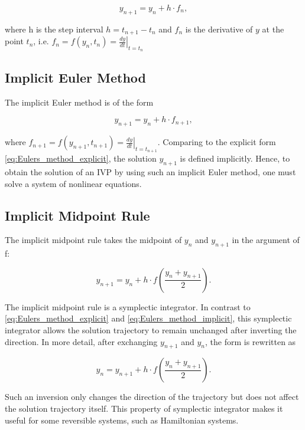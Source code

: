 \documentclass[
	parskip, 			   %
	twoside, 			   %
	DIV=14, 			   %
	BCOR=15.0mm, 		   %
	headsepline, 		   %
	open=right, 		   %
	captions=tableheading, %
	bibliography=totoc,    %
	numbers=noenddot       %
]{scrreprt}
\begin{document}
\begin{equation}
    \label{eq:Eulers_method_explicit}
    y_{n+1} = y_{n} + h \cdot f_{n},
\end{equation}

where h is the step interval $h = t_{n+1} - t_{n}$ and $f_{n}$ is the derivative of $y$ at the point $t_{n}$, i.e. $f_{n} = f(y_n, t_n) = \left. \frac{dy}{dt} \right|_{t=t_n}$

\subsection{Implicit Euler Method}
The implicit Euler method is of the form

\begin{equation}
    \label{eq:Eulers_method_implicit}
    y_{n+1} = y_{n} + h \cdot f_{n+1},
\end{equation}

where $f_{n+1} = f(y_{n+1}, t_{n+1}) = \left. \frac{dy}{dt} \right|_{t=t_{n+1}}$. Comparing to the explicit form \ref{eq:Eulers_method_explicit}, the solution $y_{n+1}$ is defined implicitly. Hence, to obtain the solution of an IVP by using such an implicit Euler method, one must solve a system of nonlinear equations.

\subsection{Implicit Midpoint Rule}
The implicit midpoint rule takes the midpoint of $y_{n}$ and $y_{n+1}$ in the argument of f:

\begin{equation}
    \label{eq:Midpoint_rule_implicit}
    y_{n+1} = y_{n} + h \cdot f(\frac{y_{n} + y_{n+1}}{2}).
\end{equation}

The implicit midpoint rule is a symplectic integrator. In contrast to \ref{eq:Eulers_method_explicit} and \ref{eq:Eulers_method_implicit}, this symplectic integrator allows the solution trajectory to remain unchanged after inverting the direction. In more detail, after exchanging $y_{n+1}$ and $y_{n}$, the form is rewritten as

\begin{equation}
    \label{eq:Midpoint_rule_implicit_inverted}
    y_{n} = y_{n+1} + h \cdot f(\frac{y_{n} + y_{n+1}}{2}).
\end{equation}

Such an inversion only changes the direction of the trajectory but does not affect the solution trajectory itself. This property of symplectic integrator makes it useful for some reversible systems, such as Hamiltonian systems.
\end{document}
